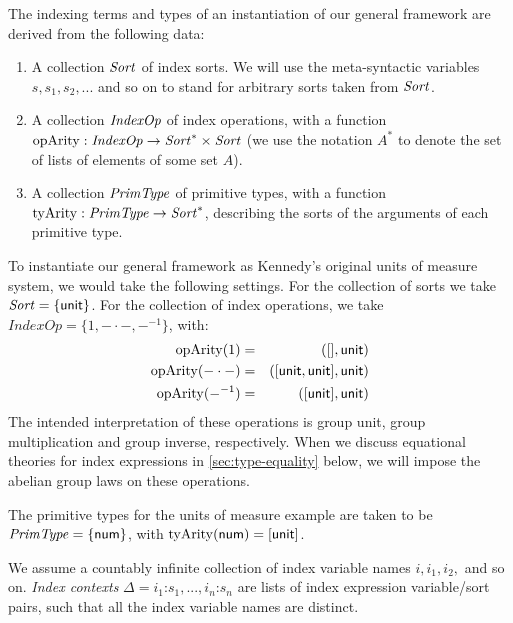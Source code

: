 The indexing terms and types of an instantiation of our general
framework are derived from the following data:
\begin{enumerate}
\item A collection $\mathit{Sort}$ of index sorts. We will use the
  meta-syntactic variables $s,s_1,s_2,...$ and so on to stand for
  arbitrary sorts taken from $\mathit{Sort}$.
\item A collection $\mathit{IndexOp}$ of index operations, with a function
  $\mathrm{opArity} : \mathit{IndexOp} \to \mathit{Sort}^* \times \mathit{Sort}$ (we use
  the notation $A^*$ to denote the set of lists of elements of some
  set $A$).
\item A collection $\mathit{PrimType}$ of primitive types, with a function
  $\mathrm{tyArity} : \mathit{PrimType} \to \mathit{Sort}^*$, describing the sorts
  of the arguments of each primitive type.
\end{enumerate}

\begin{example}
\end{example}

\begin{example}
  To instantiate our general framework as Kennedy's original units
  of measure system, we would take the following settings. For the
  collection of sorts we take $\mathit{Sort} = \{ \mathsf{unit} \}$. For
  the collection of index operations, we take $\mathit{IndexOp} = \{1,
  -\cdot-, -^{-1}\}$, with:
  \begin{eqnarray*}
    \mathrm{opArity}{(1)} &=& ([],\mathsf{unit}) \\
    \mathrm{opArity}{(-\cdot-)} & = & ([\mathsf{unit},\mathsf{unit}],\mathsf{unit}) \\
    \mathrm{opArity}{(-^{-1})} & = & ([\mathsf{unit}],\mathsf{unit})
  \end{eqnarray*}
  The intended interpretation of these operations is group unit, group
  multiplication and group inverse, respectively. When we discuss
  equational theories for index expressions in
  \autoref{sec:type-equality} below, we will impose the abelian group
  laws on these operations.

  The primitive types for the units of measure example are taken to be
  $\mathit{PrimType} = \{ \mathsf{num} \}$, with
  $\mathrm{tyArity}(\mathsf{num}) = [\mathsf{unit}]$.
\end{example}

We assume a countably infinite collection of index variable names $i,
i_1, i_2,$ and so on. \emph{Index contexts} $\Delta = i_1 \mathord:
s_1, ..., i_n \mathord: s_n$ are lists of index expression
variable/sort pairs, such that all the index variable names are
distinct.

